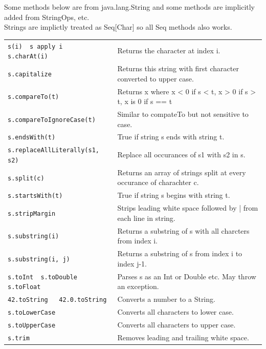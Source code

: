 \documentclass[article, a5paper]{memoir}
\renewcommand{\arraystretch}{0.9}
\newcommand{\code}{\lstinline[basicstyle=\ttfamily]}
\newcommand{\Newline}{\vspace{\baselineskip}}
\begin{document}
{\small\renewcommand{\arraystretch}{1.15}

Some methods below are from java.lang.String and some methods are implicitly added from StringOps, etc.\\ Strings are implictly treated as Seq[Char] so all Seq methods also works.

\vspace{0.5em}

\begin{tabular}{@{}l l}
\code|s(i)  s apply i   s.charAt(i)| & Returns the character at index i. \\
\code|s.capitalize| & Returns this string with first character converted to upper case. \\
\code|s.compareTo(t)| & Returns x where x < 0 if s < t, x > 0 if s > t, x is 0 if s == t\\
\code|s.compareToIgnoreCase(t)| & Similar to compateTo but not sensitive to case.\\
\code|s.endsWith(t)| & True if string s ends with string t. \\
\code|s.replaceAllLiterally(s1, s2)| & Replace all occurances of s1 with s2 in s. \\
\code|s.split(c)| & Returns an array of strings split at every occurance of charachter c. \\
\code|s.startsWith(t)| & True if string s begins with string t. \\
\code|s.stripMargin| & Strips leading white space followed by | from each line in string.\\
\code|s.substring(i)| & Returns a substring of s with all charcters from index i.\\
\code|s.substring(i, j)| & Returns a substring of s from index i to index j-1.\\
\code|s.toInt  s.toDouble  s.toFloat| & Parses s as an Int or Double etc. May throw an exception.\\
\code|42.toString   42.0.toString| & Converts a number to a String.\\
\code|s.toLowerCase| & Converts all characters to lower case.\\
\code|s.toUpperCase| & Converts all characters to upper case. \\
\code|s.trim| & Removes leading and trailing white space.\\
\end{tabular}
} 



\Newline
\end{document}
